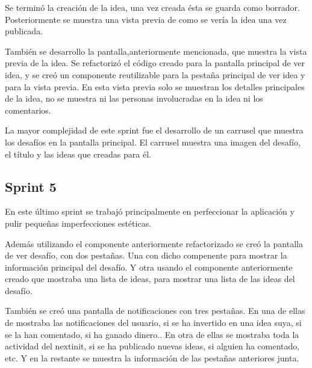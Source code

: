 Se terminó la creación de la idea, una vez creada ésta se guarda como borrador. Posteriormente se muestra una vista previa de 
como se vería la idea una vez publicada.

También se desarrollo la pantalla,anteriormente mencionada, que muestra la vista previa de la idea. Se refactorizó el código creado 
para la pantalla principal de ver idea, y se creó un componente reutilizable para la pestaña principal de ver idea y para la vista previa. En 
esta vista previa solo se muestran los detalles principales de la idea, no se muestra ni las personas involucradas en la idea ni los 
comentarios.

La mayor complejidad de este sprint fue el desarrollo de un carrusel que muestra los desafíos en la pantalla principal. El carrusel muestra una imagen del desafío, 
el título y las ideas que creadas para él.

\subsection{Sprint 5}

En este último sprint se trabajó principalmente en perfeccionar la aplicación y pulir pequeñas imperfecciones estéticas. 

Además utilizando el componente anteriormente refactorizado se creó la pantalla de ver desafío, con dos pestañas. Una con dicho compenente 
para mostrar la información principal del desafío. Y otra usando el componente anteriormente creado que mostraba una lista de ideas, para 
mostrar una lista de las ideas del desafío.

También se creó una pantalla de notificaciones con tres pestañas. En una de ellas de mostraba las notificaciones del usuario, si se ha invertido en una idea suya, si se la han comentado, si ha ganado dinero.. En otra de ellas se mostraba toda la actividad del 
nextinit, si se ha publicado nuevas ideas, si alguien ha comentado, etc. Y en la restante se muestra la información de las pestañas 
anteriores junta.


